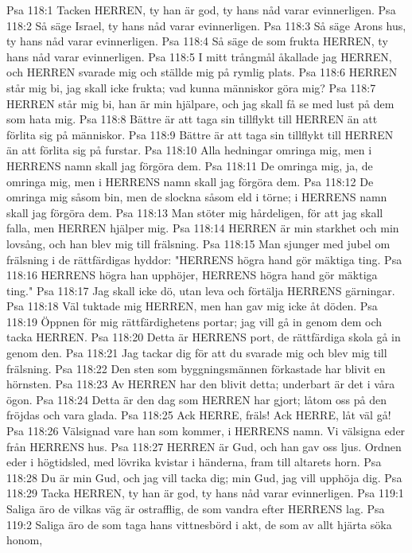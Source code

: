 Psa 118:1  Tacken HERREN, ty han är god, ty hans nåd varar evinnerligen.
Psa 118:2  Så säge Israel, ty hans nåd varar evinnerligen.
Psa 118:3  Så säge Arons hus, ty hans nåd varar evinnerligen.
Psa 118:4  Så säge de som frukta HERREN, ty hans nåd varar evinnerligen.
Psa 118:5  I mitt trångmål åkallade jag HERREN, och HERREN svarade mig och ställde mig på rymlig plats.
Psa 118:6  HERREN står mig bi, jag skall icke frukta; vad kunna människor göra mig?
Psa 118:7  HERREN står mig bi, han är min hjälpare, och jag skall få se med lust på dem som hata mig.
Psa 118:8  Bättre är att taga sin tillflykt till HERREN än att förlita sig på människor.
Psa 118:9  Bättre är att taga sin tillflykt till HERREN än att förlita sig på furstar.
Psa 118:10  Alla hedningar omringa mig, men i HERRENS namn skall jag förgöra dem.
Psa 118:11  De omringa mig, ja, de omringa mig, men i HERRENS namn skall jag förgöra dem.
Psa 118:12  De omringa mig såsom bin, men de slockna såsom eld i törne; i HERRENS namn skall jag förgöra dem.
Psa 118:13  Man stöter mig hårdeligen, för att jag skall falla, men HERREN hjälper mig.
Psa 118:14  HERREN är min starkhet och min lovsång, och han blev mig till frälsning.
Psa 118:15  Man sjunger med jubel om frälsning i de rättfärdigas hyddor: "HERRENS högra hand gör mäktiga ting.
Psa 118:16  HERRENS högra han upphöjer, HERRENS högra hand gör mäktiga ting."
Psa 118:17  Jag skall icke dö, utan leva och förtälja HERRENS gärningar.
Psa 118:18  Väl tuktade mig HERREN, men han gav mig icke åt döden.
Psa 118:19  Öppnen för mig rättfärdighetens portar; jag vill gå in genom dem och tacka HERREN.
Psa 118:20  Detta är HERRENS port, de rättfärdiga skola gå in genom den.
Psa 118:21  Jag tackar dig för att du svarade mig och blev mig till frälsning.
Psa 118:22  Den sten som byggningsmännen förkastade har blivit en hörnsten.
Psa 118:23  Av HERREN har den blivit detta; underbart är det i våra ögon.
Psa 118:24  Detta är den dag som HERREN har gjort; låtom oss på den fröjdas och vara glada.
Psa 118:25  Ack HERRE, fräls! Ack HERRE, låt väl gå!
Psa 118:26  Välsignad vare han som kommer, i HERRENS namn. Vi välsigna eder från HERRENS hus.
Psa 118:27  HERREN är Gud, och han gav oss ljus. Ordnen eder i högtidsled, med lövrika kvistar i händerna, fram till altarets horn.
Psa 118:28  Du är min Gud, och jag vill tacka dig; min Gud, jag vill upphöja dig.
Psa 118:29  Tacka HERREN, ty han är god, ty hans nåd varar evinnerligen.
Psa 119:1  Saliga äro de vilkas väg är ostrafflig, de som vandra efter HERRENS lag.
Psa 119:2  Saliga äro de som taga hans vittnesbörd i akt, de som av allt hjärta söka honom,
